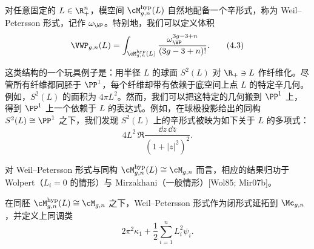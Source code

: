 对任意固定的 $L\in\R_+^n$，模空间 $\cM^{\mathrm{hyp}}_{g,n}(L)$ 自然地配备一个辛形式，称为 Weil--Petersson 形式，记作 $\omega_{\WP}$。特别地，我们可以定义体积
\begin{equation}
  \VWP_{g,n}(L)=\int_{\cM^{\mathrm{hyp}}_{g,n}(L)}\frac{\omega_{\WP}^{3g-3+n}}{(3g-3+n)!}.
  \tag{4.3}
\end{equation}

这类结构的一个玩具例子是：用半径 $L$ 的球面 $S^2(L)$ 对 $\R_+\ni L$ 作纤维化。尽管所有纤维都同胚于 $\PP^1$，每个纤维却带有依赖于底空间上点 $L$ 的特定辛几何。例如，$S^2(L)$ 的面积为 $4\pi L^2$。然而，我们可以把这特定的几何搬到 $\PP^1$ 上，得到 $\PP^1$ 上一个依赖于 $L$ 的表达式。例如，在球极投影给出的同构 $S^2(L)\cong\PP^1$ 之下，我们发现 $S^2(L)$ 上的辛形式被映为如下关于 $L$ 的多项式：
\begin{equation}
  4L^2\,\Re\frac{\dd z\,\dd\bar z}{(1+|z|^2)^2}.
  \tag{4.4}
\end{equation}

对 Weil--Petersson 形式与同构 $\cM^{\mathrm{hyp}}_{g,n}(L)\cong\cM_{g,n}$ 而言，相应的结果归功于 Wolpert（$L_i=0$ 的情形）与 Mirzakhani（一般情形）[Wol85; Mir07b]。

\begin{theorem}[4.2]
在同胚 $\cM^{\mathrm{hyp}}_{g,n}(L)\cong\cM_{g,n}$ 之下，Weil--Petersson 形式作为闭形式延拓到 $\Mc_{g,n}$，并定义上同调类
\begin{equation}
  2\pi^2\kappa_1+\frac12\sum_{i=1}^n L_i^2\psi_i.
  \tag{4.5}
\end{equation}
\end{theorem}


